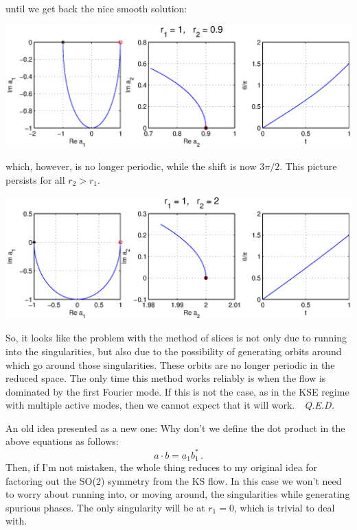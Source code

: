 \documentclass[letter,10pt]{article}
\begin{document}
until we get back the nice smooth solution:

\vspace{2ex}\noindent\includegraphics[width=\textwidth]{sliceflow6.eps}

which, however, is no longer periodic, while the shift is now $3\pi/2$.  This picture persists for all $r_2 > r_1$.

\vspace{2ex}\noindent\includegraphics[width=\textwidth]{sliceflow7.eps}

So, it looks like the problem with the method of slices is not only due to running into the singularities, but also due to the possibility of generating orbits around which go around those singularities.  These orbits are no longer periodic in the reduced space.  The only time this method works reliably is when the flow is dominated by the first Fourier mode.  If this is not the case, as in the KSE regime with multiple active modes, then we cannot expect that it will work.~~{\em Q.E.D.}

\vspace{2ex}
An old idea presented as a new one:  Why don't we define the dot product in the above equations as follows:
\[ a \cdot b = a_1 b_1^*\,. \]
Then, if I'm not mistaken, the whole thing reduces to my original idea for factoring out the SO(2) symmetry from the KS flow.  In this case we won't need to worry about running into, or moving around, the singularities while generating spurious phases.  The only singularity will be at $r_1 = 0$, which is trivial to deal with.
\end{document}
